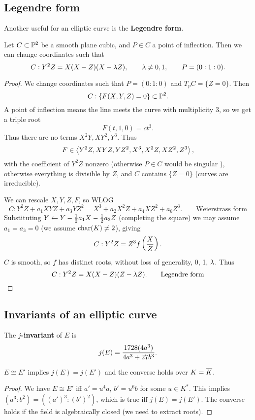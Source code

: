

\subsection{Legendre form}
Another useful for an elliptic curve is the \textbf{Legendre form}.
\begin{lem}
Let $C\subset \mathbb{P}^2$ be a smooth plane cubic, and $P\in C$ a point of inflection. Then we can change coordinates such that
\[
C:Y^2Z=X(X-Z)(X-\lambda Z),\qquad \lambda\ne 0,1,\qquad P=(0:1:0).
\]
\end{lem}
\begin{proof}
We change coordinates %
such that $P=(0:1:0)$ and $T_pC=\{Z=0\}$. Then
\[
C:\{F(X,Y,Z)=0\}\subset \mathbb{P}^2.
\]
A point of inflection means the line meets the curve with multiplicity 3, so we get a triple root
\[
F(t,1,0)=ct^3.
\]
Thus there are no terms $X^2Y,XY^2, Y^3$. Thus
\[
F\in \left\langle {Y^2Z,XYZ,YZ^2,X^3,X^2Z,XZ^2, Z^3}\right\rangle,
\]
with the coefficient of $Y^2Z$ nonzero (otherwise $P\in C$ would be singular ), otherwise everything is divisible by $Z$, and $C$ contains $\{Z=0\}$ (curves are irreducible).

We can rescale $X,Y,Z,F$, so WLOG
\[
C:Y^2Z+a_1XYZ+a_3YZ^2=X^3+a_2X^2Z+a_4XZ^2+a_6Z^3.\qquad \text{Weierstrass form}
\]
Substituting $Y\leftarrow Y-\frac{1}{2} a_1X-\frac{1}{2} a_3Z$ (completing the square) we may assume $a_1=a_3=0$ (we assume $\operatorname{char}(K)\ne 2$), giving
\[
C: Y^2Z=Z^3f\left( {\frac{X}{Z}} \right).
\]
$C$ is smooth, so $f$ has distinct roots, without loss of generality, 0, 1, $\lambda$. Thus
\[
C: Y^2Z=X(X-Z)(Z-\lambda Z).\qquad \text{Legendre form}
\]
\end{proof}



\subsection{Invariants of an elliptic curve}


\begin{df}
The \textbf{$j$-invariant} of $E$ is
\[
j(E)=\frac{1728(4a^3)}{4a^3+27b^3}.
\]
\end{df}
\begin{cor}
$E\cong E'$ implies $j(E)=j(E')$ and the converse holds over $K=\overline{K}$. 
\end{cor}
\begin{proof}
We have $E\cong E'$ iff $a'=u^4a$, $b'=u^6b$ for some $u\in K^*$. This implies $(a^3:b^2)=((a')^3:(b')^2)$, which is true iff $j(E)=j(E')$. The converse holds if the field is algebraically closed (we need to extract roots).
\end{proof}


